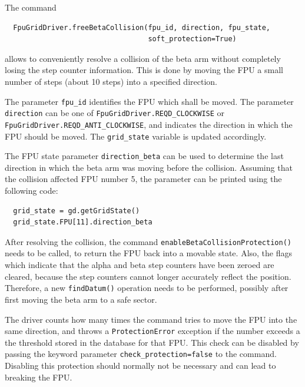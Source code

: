 \documentclass[fontsize=12,a4paper]{scrreprt}
\begin{document}
The command
\begin{verbatim}
  FpuGridDriver.freeBetaCollision(fpu_id, direction, fpu_state,
                                  soft_protection=True)
\end{verbatim}
allows to conveniently resolve a collision
of the beta arm without completely losing the step counter
information. This is done by moving the FPU a small number of steps
(about 10 steps) into a specified direction.

\begin{sloppypar}
The parameter \texttt{fpu\_id} identifies the FPU which shall be
moved. The parameter \texttt{direction} can be one of
\texttt{FpuGridDriver.REQD\_CLOCKWISE} or
\texttt{FpuGridDriver.REQD\_ANTI\_CLOCKWISE}, and indicates the
direction in which the FPU should be moved. The \texttt{grid\_state}
variable is updated accordingly.
\end{sloppypar}

%
The FPU state parameter \texttt{direction\_beta} can be used to
determine the last direction in which the beta arm was moving before
the collision. Assuming that the collision affected FPU number 5,
the parameter can be printed using the following code:

\begin{verbatim}
  grid_state = gd.getGridState()
  grid_state.FPU[11].direction_beta
\end{verbatim}


After resolving the collision, the command
\texttt{enableBetaCollisionProtection()} needs to be called, to return
the FPU back into a movable state.  Also, the flags which indicate
that the alpha and beta step counters have been zeroed are cleared,
because the step counters cannot longer accurately reflect the
position. Therefore, a new \texttt{findDatum()} operation needs to be
performed, possibly after first moving the beta arm to a safe sector.

The driver counts how many times the command tries to move the FPU
into the same direction, and throws a \texttt{ProtectionError}
exception if the number exceeds a the threshold stored in the database
for that FPU. This check can be disabled by passing the keyword
parameter \texttt{check\_protection=false} to the command. Disabling
this protection should normally not be necessary and can lead to
breaking the FPU.
\end{document}
